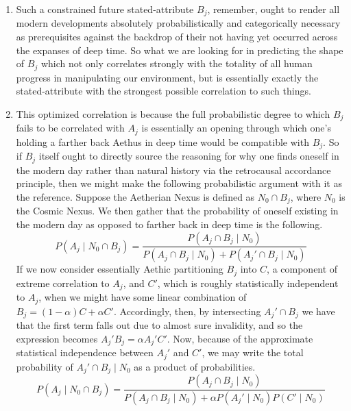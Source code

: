 \begin{concept}
    \begin{enumerate}
        \item Such a constrained future stated-attribute $B_j$, remember, ought to render all modern developments absolutely probabilistically and categorically necessary as prerequisites against the backdrop of their not having yet occurred across the expanses of deep time. So what we are looking for in predicting the shape of $B_j$ which not only correlates strongly with the totality of all human progress in manipulating our environment, but is essentially exactly the stated-attribute with the strongest possible correlation to such things.
        \item This optimized correlation is because the full probabilistic degree to which $B_j$ fails to be correlated with $A_j$ is essentially an opening through which one's holding a farther back Aethus in deep time would be compatible with $B_j$. So if $B_j$ itself ought to directly source the reasoning for why one finds oneself in the modern day rather than natural history via the retrocausal accordance principle, then we might make the following probabilistic argument with it as the reference. Suppose the Aetherian Nexus is defined as $N_0 \cap B_j$, where $N_0$ is the Cosmic Nexus. We then gather that the probability of oneself existing in the modern day as opposed to farther back in deep time is the following.
        \begin{equation}
            P \! \left( A_j \mid N_0 \cap B_j \right) = \frac{P \! \left( A_j \cap B_j \mid N_0 \right)}{P \! \left( A_j \cap B_j \mid N_0 \right) + P \! \left( A_j' \cap B_j \mid N_0 \right)}
        \end{equation}
        If we now consider essentially Aethic partitioning $B_j$ into $C$, a component of extreme correlation to $A_j$, and $C'$, which is roughly statistically independent to $A_j$, when we might have some linear combination of $B_j = \left( 1 - \alpha \right) C + \alpha C'$. Accordingly, then, by intersecting $A_j' \cap B_j$ we have that the first term falls out due to almost sure invalidity, and so the expression becomes $A_j' B_j = \alpha A_j' C'$. Now, because of the approximate statistical independence between $A_j'$ and $C'$, we may write the total probability of $A_j' \cap B_j \mid N_0$ as a product of probabilities. 
        \begin{equation}
            P \! \left( A_j \mid N_0 \cap B_j \right) = \frac{P \! \left( A_j \cap B_j \mid N_0 \right)}{P \! \left( A_j \cap B_j \mid N_0 \right) + \alpha P \! \left( A_j' \mid N_0 \right) P \! \left( C' \mid N_0 \right)}

\end{equation}
\end{enumerate}
\end{concept}
